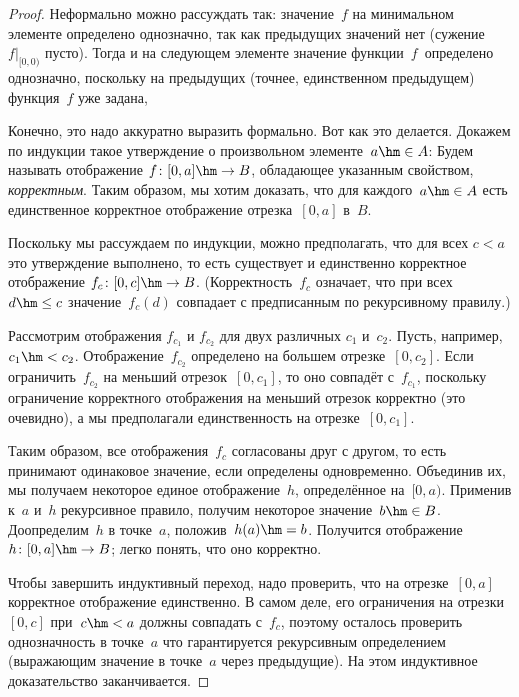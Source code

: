 \begin{proof}
Неформально можно рассуждать так: значение~$f$ на минимальном
элементе определено однозначно, так как предыдущих значений
нет (сужение~$f|_{[0,0)}$ пусто). Тогда и на следующем
элементе значение функции~$f$~определено однозначно, поскольку на предыдущих
(точнее, единственном предыдущем) функция~$f$ уже задана, 

Конечно, это надо аккуратно выразить формально. Вот как это
делается. Докажем по индукции такое утверждение о произвольном
элементе~$a\hm\in A$:
\noindent
Будем называть отображение $f\colon [0,a]\hm\to B$, обладающее
указанным свойством, \emph{корректным}. Таким образом,
мы хотим доказать, что для каждого~$a\hm\in A$ есть единственное
корректное отображение отрезка~$[0,a]$ в~$B$.

Поскольку мы рассуждаем по индукции, можно предполагать, что для
всех $c<a$ это утверждение выполнено, то есть существует и
единственно корректное отображение $f_c\colon [0,c]\hm\to B$.
(Корректность~$f_c$ означает, что при всех~$d\hm\le c$ значение~$f_c(d)$
совпадает с предписанным по рекурсивному правилу.)

Рассмотрим отображения $f_{c_1}$ и $f_{c_2}$ для двух различных
$c_1$ и~$c_2$. Пусть, например,~$c_1\hm<c_2$. Отображение~$f_{c_2}$
определено на большем отрезке~$[0,c_2]$. Если ограничить~$f_{c_2}$ на
меньший отрезок~$[0,c_1]$, то оно совпадёт с~$f_{c_1}$,
поскольку ограничение корректного отображения на меньший
отрезок корректно (это очевидно), а мы предполагали
единственность на отрезке~$[0,c_1]$.

Таким образом, все отображения~$f_c$ согласованы друг с другом,
то есть принимают одинаковое значение, если определены
одновременно. Объединив их, мы получаем некоторое единое
отображение~$h$, определённое на~$[0,a)$. Применив к~$a$ и~$h$
рекурсивное правило, получим некоторое значение~$b\hm\in B$.
Доопределим~$h$ в точке~$a$, положив~$h(a)\hm=b$.
Получится отображение $h\colon [0,a]\hm\to B$; легко
понять, что оно корректно.

Чтобы завершить индуктивный переход, надо проверить, что на отрезке~$[0,a]$
корректное отображение единственно. В самом деле, его
ограничения на отрезки~$[0,c]$ при~$c\hm<a$ должны совпадать с~$f_c$,
поэтому осталось проверить однозначность в точке~$a$\т
что гарантируется рекурсивным определением (выражающим значение
в точке~$a$ через предыдущие).
На этом индуктивное доказательство заканчивается.


\end{proof}
